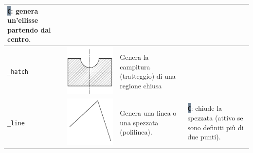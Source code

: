 \documentclass[..]{../IEEEphot}
\newcommand{\param}[1]{\colorbox{LightSlateGray}{\color{Navy}\texttt{\textbf{#1}}}}
\begin{document}
\begin{center}
\begin{longtable}{m{.1\linewidth}m{.2\linewidth}m{.3\linewidth}m{.3\linewidth}}
\param{C}: genera un'ellisse partendo dal centro.
\\
\midrule
\texttt{\_hatch} & \includegraphics[width = 0.8\linewidth, keepaspectratio]{../images/jpg/_hatch.jpg} & Genera la campitura (tratteggio) di una regione chiusa & 
\\
\midrule
\texttt{\_line} & \includegraphics[width = 0.8\linewidth, keepaspectratio]{../images/jpg/_line.jpg} & Genera una linea o una spezzata (polilinea). & 
\param{C}: chiude la spezzata (attivo se sono definiti più di due punti). \\
\midrule

\end{longtable}
\end{center}
\end{document}
